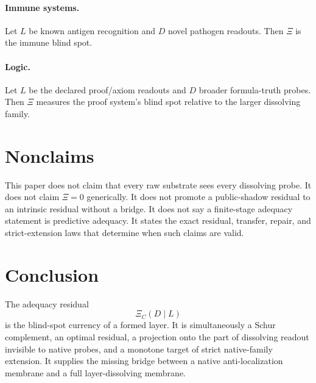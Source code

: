 \documentclass[11pt]{article}
\begin{document}
\paragraph{Immune systems.}
Let $L$ be known antigen recognition and $D$ novel pathogen readouts.  Then $\Xi$ is the immune blind spot.

\paragraph{Logic.}
Let $L$ be the declared proof/axiom readouts and $D$ broader formula-truth probes.  Then $\Xi$ measures the proof system's blind spot relative to the larger dissolving family.

\section{Nonclaims}

This paper does not claim that every raw substrate sees every dissolving probe.  It does not claim $\Xi=0$ generically.  It does not promote a public-shadow residual to an intrinsic residual without a bridge.  It does not say a finite-stage adequacy statement is predictive adequacy.  It states the exact residual, transfer, repair, and strict-extension laws that determine when such claims are valid.

\section{Conclusion}

The adequacy residual
\[
\Xi_C(D\mid L)
\]
is the blind-spot currency of a formed layer.  It is simultaneously a Schur complement, an optimal residual, a projection onto the part of dissolving readout invisible to native probes, and a monotone target of strict native-family extension.  It supplies the missing bridge between a native anti-localization membrane and a full layer-dissolving membrane.
\end{document}
